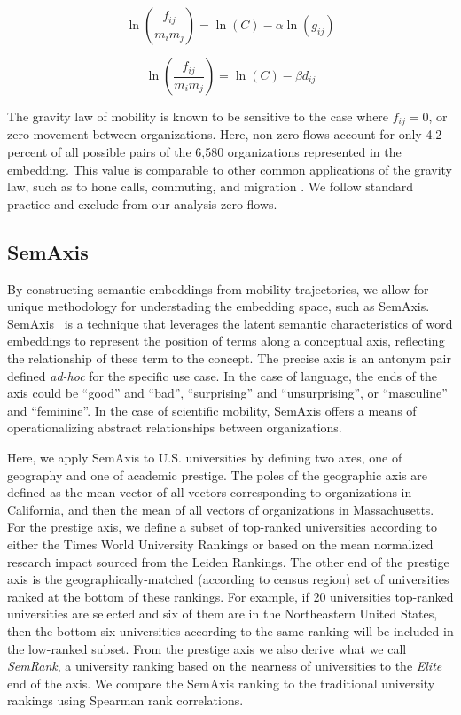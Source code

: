 \documentclass[12pt]{article} %
\begin{document}
\begin{equation}
	\label{eq:linear_flux_geo}
	\ln(\frac{f_{ij}}{m_im_j}) = \ln(C)  - \alpha \ln(g_{ij})
\end{equation}

\begin{equation}
	\label{eq:linear_flux_emb}
	\ln(\frac{f_{ij}}{m_im_j}) = \ln(C) - \beta d_{ij}
\end{equation}

The gravity law of mobility is known to be sensitive to the case where $f_{ij} = 0$, or zero movement between organizations. 
Here, non-zero flows account for only 4.2 percent of all possible pairs of  the 6,580 organizations represented in the embedding.
This value is comparable to other common applications of the gravity law, such as to hone calls, commuting, and migration \cite{simini2012universal}.
We follow standard practice and exclude from our analysis zero flows. 


%
%
\subsection*{SemAxis}
By constructing semantic embeddings from mobility trajectories, we allow for unique methodology for understading the embedding space, such as SemAxis.
SemAxis~\cite{an2018semaxis} is a technique that leverages the latent semantic characteristics of word embeddings to represent the position of terms along a conceptual axis, reflecting the relationship of these term to the concept. 
The precise axis is an antonym pair defined \textit{ad-hoc} for the specific use case.
In the case of language, the ends of the axis could be ``good'' and ``bad'', ``surprising'' and ``unsurprising'', or ``masculine'' and ``feminine''. 
In the case of scientific mobility, SemAxis offers a means of operationalizing abstract relationships between organizations.

Here, we apply SemAxis to U.S. universities by defining two axes, one of geography and one of academic prestige. 
The poles of the geographic axis are defined as the mean vector of all vectors corresponding to organizations in California, and then the mean of all vectors of organizations in Massachusetts. 
For the prestige axis, we define a subset of top-ranked universities according to either the Times World University Rankings or based on the mean normalized research impact sourced from the Leiden Rankings. 
The other end of the prestige axis is the geographically-matched (according to census region) set of universities ranked at the bottom of these rankings.
For example, if 20 universities top-ranked universities are selected and six of them are in the Northeastern United States, then the bottom six universities according to the same ranking will be included in the low-ranked subset. 
From the prestige axis we also derive what we call \textit{SemRank}, a university ranking based on the nearness of universities to the \textit{Elite} end of the axis. 
We compare the SemAxis ranking to the traditional university rankings using Spearman rank correlations. 
\end{document}
